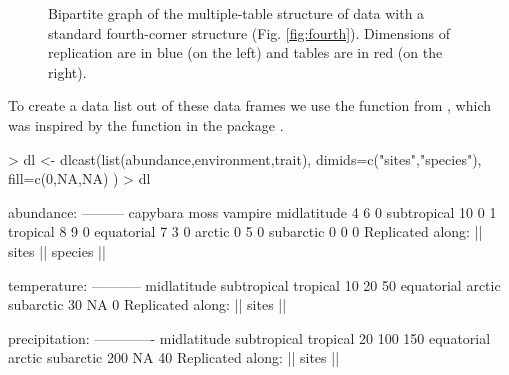 \documentclass[a4paper]{report}
\begin{document}
\begin{article}
\begin{figure}
\caption{Bipartite graph of the multiple-table structure of data with a standard fourth-corner structure (Fig. \ref{fig:fourth}).  Dimensions of replication are in blue (on the left) and tables are in red (on the right).}
\label{fig:bipartite}
\end{figure}

To create a data list out of these data frames we use the  function from , which was inspired by the  function in the  package \citep{Wickham2007}.
\begin{Schunk}
\begin{Sinput}
> dl <- dlcast(list(abundance,environment,trait),
 	dimids=c("sites","species"),
 	fill=c(0,NA,NA)
 )
> dl
\end{Sinput}
\begin{Soutput}
abundance:
---------
            capybara moss vampire
midlatitude        4    6       0
subtropical       10    0       1
tropical           8    9       0
equatorial         7    3       0
arctic             0    5       0
subarctic          0    0       0
Replicated along:  || sites || species || 


temperature:
-----------
midlatitude subtropical    tropical 
         10          20          50 
 equatorial      arctic   subarctic 
         30          NA           0 
Replicated along:  || sites || 


precipitation:
-------------
midlatitude subtropical    tropical 
         20         100         150 
 equatorial      arctic   subarctic 
        200          NA          40 
Replicated along:  || sites || 



\end{Soutput}
\end{Schunk}
\end{article}
\end{document}
